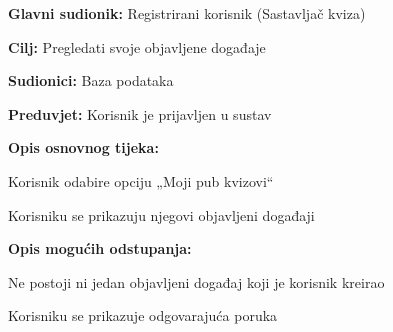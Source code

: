 				
				\noindent {}
				\begin{packed_item}
					
					\item \textbf{Glavni sudionik:} Registrirani korisnik (Sastavljač kviza)
					\item  \textbf{Cilj:} Pregledati svoje objavljene događaje
					\item  \textbf{Sudionici:} Baza podataka
					\item  \textbf{Preduvjet:} Korisnik je prijavljen u sustav
					\item  \textbf{Opis osnovnog tijeka:}
					
					\item[] \begin{packed_enum}
						
						\item Korisnik odabire opciju „Moji pub kvizovi“
						\item Korisniku se prikazuju njegovi objavljeni događaji
					\end{packed_enum}
					
					\item  \textbf{Opis mogućih odstupanja:}
					
					\item[] \begin{packed_item}
						
						\item[2.a] Ne postoji ni jedan objavljeni događaj koji je korisnik kreirao
						\item[] \begin{packed_enum}
							
							\item Korisniku se prikazuje odgovarajuća poruka
							
						\end{packed_enum}
						
					\end{packed_item}
				\end{packed_item}
				
